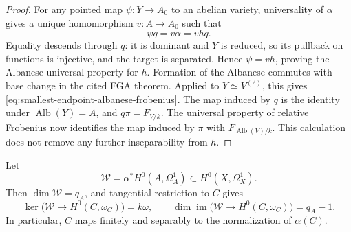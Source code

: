 \begin{proof}
For any pointed map $\psi:Y\to A_0$ to an abelian variety,
universality of $\alpha$ gives a unique homomorphism $v:A\to A_0$
such that
\[
 \psi q=v\alpha=vhq.
\]
Equality descends through $q$: it is dominant and $Y$ is reduced,
so its pullback on functions is injective, and the target is
separated.  Hence $\psi=vh$, proving the Albanese universal
property for $h$.
Formation of the Albanese commutes with base change in the cited
FGA theorem.  Applied to $Y\simeq V^{(2)}$, this gives
\eqref{eq:smallest-endpoint-albanese-frobenius}.
The map induced by $q$ is the identity under
$\operatorname{Alb}(Y)=A$, and $q\pi=F_{V/k}$.
The universal property of relative Frobenius now identifies the
map induced by $\pi$ with $F_{\operatorname{Alb}(V)/k}$.
This calculation does not remove any further inseparability
from $h$.
\end{proof}

\begin{proposition}
\label{prop:smallest-endpoint-albanese-forms}
Let
\[
 \mathcal W=\alpha^*H^0(A,\Omega_A^1)\subset H^0(X,\Omega_X^1).
\]
Then $\dim\mathcal W=q_A$, and tangential restriction to $C$ gives
\begin{equation}\label{eq:smallest-endpoint-albanese-restriction}
 \ker\bigl(\mathcal W\longrightarrow H^0(C,\omega_C)\bigr)
   =k\omega,\qquad
 \dim\operatorname{im}\bigl(\mathcal W\longrightarrow
 H^0(C,\omega_C)\bigr)=q_A-1.
\end{equation}
In particular, $C$ maps finitely and separably to the normalization
of $\alpha(C)$.
\end{proposition}

